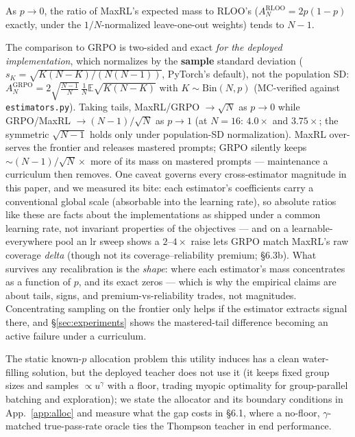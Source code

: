 \begin{proposition}\label{prop:ratio}
As $p \to 0$, the ratio of MaxRL's expected mass to RLOO's
($A_N^{\mathrm{RLOO}} = 2p(1-p)$ exactly, under the $1/N$-normalized
leave-one-out weights) tends to $N-1$.
\end{proposition}
\begin{interp}
The comparison to GRPO is two-sided and exact \emph{for the deployed
implementation}, which normalizes by the \textbf{sample} standard
deviation ($s_K = \sqrt{K(N{-}K)/(N(N{-}1))}$, PyTorch's default), not
the population SD:
$A_N^{\mathrm{GRPO}}
= 2\sqrt{\tfrac{N-1}{N}}\,\frac{1}{N}\mathbb{E}\sqrt{K(N{-}K)}$
with $K\sim\mathrm{Bin}(N,p)$ (MC-verified against
\texttt{estimators.py}). Taking tails, MaxRL/GRPO $\to \sqrt{N}$ as
$p\to 0$ while GRPO/MaxRL $\to (N{-}1)/\sqrt{N}$ as $p\to 1$
(at $N{=}16$: $4.0\times$ and $3.75\times$; the symmetric
$\sqrt{N{-}1}$ holds only under population-SD normalization). MaxRL
over-serves the frontier and releases mastered prompts; GRPO silently
keeps ${\sim}(N{-}1)/\sqrt{N}\times$ more of its mass on mastered
prompts --- maintenance a curriculum then removes. One caveat governs
every cross-estimator magnitude in this paper, and we measured its
bite: each estimator's coefficients carry a conventional global scale
(absorbable into the learning rate), so absolute ratios like these
are facts about the implementations as shipped under a common
learning rate, not invariant properties of the objectives --- and on
a learnable-everywhere pool an lr sweep shows a $2$--$4\times$ raise
lets GRPO match MaxRL's raw coverage \emph{delta} (though not its
coverage--reliability premium; \S 6.3b). What survives any
recalibration is the \emph{shape}: where each estimator's mass
concentrates as a function of $p$, and its exact zeros --- which is
why the empirical claims are about tails, signs, and
premium-vs-reliability trades, not magnitudes. Concentrating sampling on the frontier only helps if the
estimator extracts signal there, and \S\ref{sec:experiments} shows
the mastered-tail difference becoming an active failure under a
curriculum.
\end{interp}

The static known-$p$ allocation problem this utility induces has a
clean water-filling solution, but the deployed teacher does not use
it (it keeps fixed group sizes and samples $\propto u^\gamma$ with a
floor, trading myopic optimality for group-parallel batching and
exploration); we state the allocator and its boundary conditions in
App.~\ref{app:alloc} and measure what the gap costs in \S 6.1, where
a no-floor, $\gamma$-matched true-pass-rate oracle ties the Thompson
teacher in end performance.


